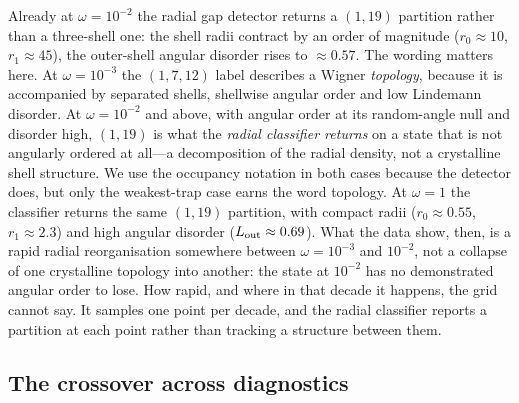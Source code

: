 Already at $\omega=10^{-2}$ the radial gap detector returns a $(1,19)$ partition rather than
a three-shell one: the shell radii contract by an order of magnitude ($r_0\approx10$,
$r_1\approx45$), the outer-shell angular disorder rises to $\approx0.57$. The wording
matters here. At $\omega=10^{-3}$ the $(1,7,12)$ label describes a
Wigner \emph{topology}, because it is accompanied by separated shells, shellwise angular
order and low Lindemann disorder. At $\omega=10^{-2}$ and above, with angular order at its
random-angle null and disorder high, $(1,19)$ is what the \emph{radial classifier returns}
on a state that is not angularly ordered at all---a decomposition of the radial density, not
a crystalline shell structure. We use the occupancy notation in both cases because the
detector does, but only the weakest-trap case earns the word topology.
At $\omega=1$ the classifier returns the same $(1,19)$ partition, with compact radii
($r_0\approx0.55$, $r_1\approx2.3$) and high angular disorder
($L_{\rm out}\approx0.69$).
What the data show, then, is a rapid radial reorganisation somewhere between
$\omega=10^{-3}$ and $10^{-2}$, not a collapse of one crystalline topology into another: the
state at $10^{-2}$ has no demonstrated angular order to lose. How rapid, and where in that
decade it happens, the grid cannot say. It samples one point per decade, and the radial
classifier reports a partition at each point rather than tracking a structure between them.

\subsection{The crossover across diagnostics}
\label{sec:wigner-synthesis}


